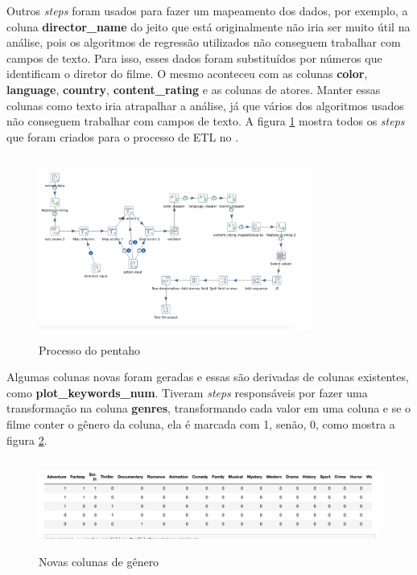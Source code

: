 Outros \textit{steps} foram usados para fazer um mapeamento dos dados, por exemplo, a coluna \textbf{director\_name} do jeito que está originalmente não iria ser muito útil na análise, pois os algoritmos de regressão utilizados não conseguem trabalhar com campos de texto. Para isso, esses dados foram substituídos por números que identificam o diretor do filme. O mesmo aconteceu com as colunas \textbf{color}, \textbf{language}, \textbf{country}, \textbf{content\_rating} e as colunas de atores. Manter essas colunas como texto iria atrapalhar a análise, já que vários dos algoritmos usados não conseguem trabalhar com campos de texto. A figura \ref{pentahoTransformation} mostra todos os \textit{steps} que foram criados para o processo de ETL no \pdi.

\begin{figure}[H]
\centering
\includegraphics[height=6cm, width=9cm]{imagens/transformacao.png}
\caption{Processo do pentaho}
\label{pentahoTransformation}
\end{figure}

Algumas colunas novas foram geradas e essas são derivadas de colunas existentes, como \textbf{plot\_keywords\_num}. Tiveram \textit{steps} responsáveis por fazer uma transformação na coluna \textbf{genres}, transformando cada valor em uma coluna e se o filme conter o gênero da coluna, ela é marcada com 1, senão, 0, como mostra a figura \ref{newcolumns}.

\begin{figure}[H]
\centering
\includegraphics[height=3cm]{imagens/genres.png}
\caption{Novas colunas de gênero}
\label{newcolumns}
\end{figure}

